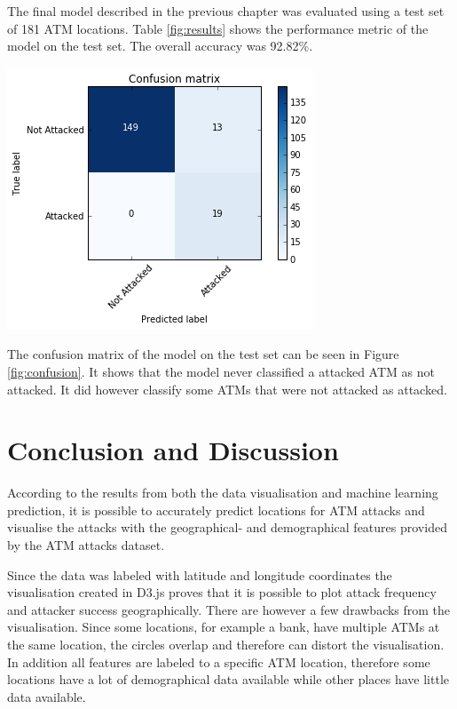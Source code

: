 \documentclass[conference]{IEEEtran}
\begin{document}
The final model described in the previous chapter was evaluated using a test set of 181 ATM locations. Table \ref{fig:results} shows the performance metric of the model on the test set. The overall accuracy was 92.82\%. 

{
\centering
\includegraphics[width=1\linewidth]{confusionmatrix.png}\\
\label{fig:confusion}
}

The confusion matrix of the model on the test set can be seen in Figure \ref{fig:confusion}. It shows that the model never classified a attacked ATM as not attacked. It did however classify some ATMs that were not attacked as attacked. 

\section{Conclusion and Discussion} \label{results}
According to the results from both the data visualisation and machine learning prediction, it is possible to accurately predict locations for ATM attacks and visualise the attacks with the geographical- and demographical features provided by the ATM attacks dataset.

Since the data was labeled with latitude and longitude coordinates the visualisation created in D3.js proves that it is possible to plot attack frequency and attacker success geographically. There are however a few drawbacks from the visualisation. Since some locations, for example a bank, have multiple ATMs at the same location, the circles overlap and therefore can distort the visualisation. In addition all features are labeled to a specific ATM location, therefore some locations have a lot of demographical data available while other places have little data available.
\end{document}
